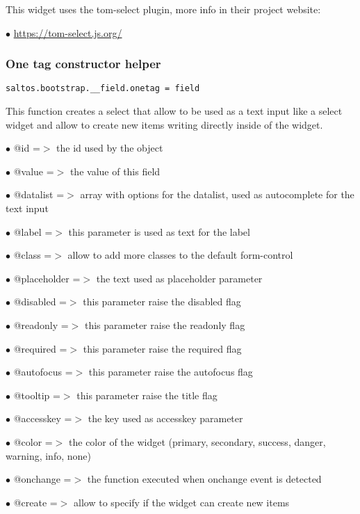 \documentclass[a4paper]{article}
\def\htmladdnormallink#1#2{\href{#2}{#1}}
\begin{document}
This widget uses the tom-select plugin, more info in their project website:

\begin{compactitem}
\item[\color{myblue}$\bullet$] \htmladdnormallink{https://tom-select.js.org/}{https://tom-select.js.org/}
\end{compactitem}

\hypertarget{toc638}{}
\subsubsection{One tag constructor helper}

\begin{lstlisting}
saltos.bootstrap.__field.onetag = field
\end{lstlisting}

This function creates a select that allow to be used as a text input like a select widget and allow
to create new items writing directly inside of the widget.

\begin{compactitem}
\item[\color{myblue}$\bullet$] @id          =$>$ the id used by the object
\item[\color{myblue}$\bullet$] @value       =$>$ the value of this field
\item[\color{myblue}$\bullet$] @datalist    =$>$ array with options for the datalist, used as autocomplete for the text input
\item[\color{myblue}$\bullet$] @label       =$>$ this parameter is used as text for the label
\item[\color{myblue}$\bullet$] @class       =$>$ allow to add more classes to the default form-control
\item[\color{myblue}$\bullet$] @placeholder =$>$ the text used as placeholder parameter
\item[\color{myblue}$\bullet$] @disabled    =$>$ this parameter raise the disabled flag
\item[\color{myblue}$\bullet$] @readonly    =$>$ this parameter raise the readonly flag
\item[\color{myblue}$\bullet$] @required    =$>$ this parameter raise the required flag
\item[\color{myblue}$\bullet$] @autofocus   =$>$ this parameter raise the autofocus flag
\item[\color{myblue}$\bullet$] @tooltip     =$>$ this parameter raise the title flag
\item[\color{myblue}$\bullet$] @accesskey   =$>$ the key used as accesskey parameter
\item[\color{myblue}$\bullet$] @color       =$>$ the color of the widget (primary, secondary, success, danger, warning, info, none)
\item[\color{myblue}$\bullet$] @onchange    =$>$ the function executed when onchange event is detected
\item[\color{myblue}$\bullet$] @create      =$>$ allow to specify if the widget can create new items
\end{compactitem}
\end{document}
